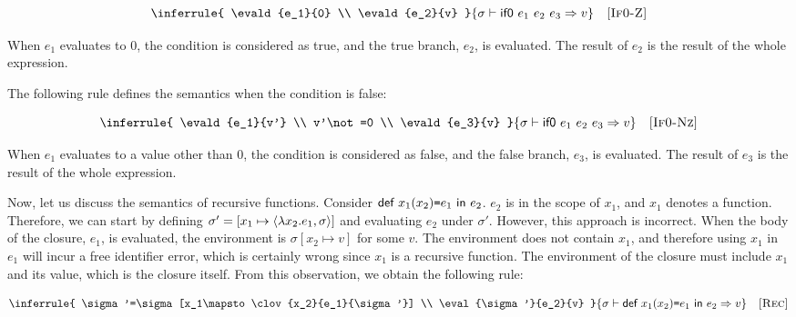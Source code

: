 \vspace{-1em}

\[
  \inferrule
  {
    \evald{e_1}{0} \\
    \evald{e_2}{v}
  }
  { \evald{\eifz{e_1}{e_2}{e_3}}{v} }
  \quad\textsc{[If0-Z]}
\]

When $e_1$ evaluates to $0$, the condition is considered as true, and the true
branch, $e_2$, is evaluated. The result of $e_2$ is the result of the whole
expression.

The following rule defines the semantics when the condition is false:


\vspace{-1em}

\[
\inferrule
  {
    \evald{e_1}{v'} \\
    v'\not=0 \\
    \evald{e_3}{v}
  }
  { \evald{\eifz{e_1}{e_2}{e_3}}{v} }
  \quad\textsc{[If0-Nz]}
\]

When $e_1$ evaluates to a value other than $0$, the condition is considered as
false, and the false
branch, $e_3$, is evaluated. The result of $e_3$ is the result of the whole
expression.

Now, let us discuss the semantics of recursive functions.
Consider $\textsf{def}\ x_1(x_2)\texttt{=} e_1\ \textsf{in}\ e_2$.
$e_2$ is in the scope of $x_1$, and $x_1$ denotes a function. Therefore, we can
start by defining $\sigma'=[x_1\mapsto\langle\lambda x_2.e_1,\sigma\rangle]$ and evaluating
$e_2$ under $\sigma'$. However, this approach is incorrect. When the body of the
closure, $e_1$, is evaluated, the environment is $\sigma[x_2\mapsto v]$ for some
$v$. The environment does not contain $x_1$, and therefore using $x_1$ in
$e_1$ will incur a free identifier error, which is certainly wrong since $x_1$
is a recursive function. The environment of the closure must include $x_1$ and
its value, which is the closure itself. From this observation, we obtain the
following rule:


\vspace{-1em}

\[
  \inferrule
  {
    \sigma'=\sigma[x_1\mapsto\clov{x_2}{e_1}{\sigma'}] \\
    \eval{\sigma'}{e_2}{v}
  }
  { \evald{\erec{x_1}{x_2}{e_1}{e_2}}{v} }
  \quad\textsc{[Rec]}
\]

